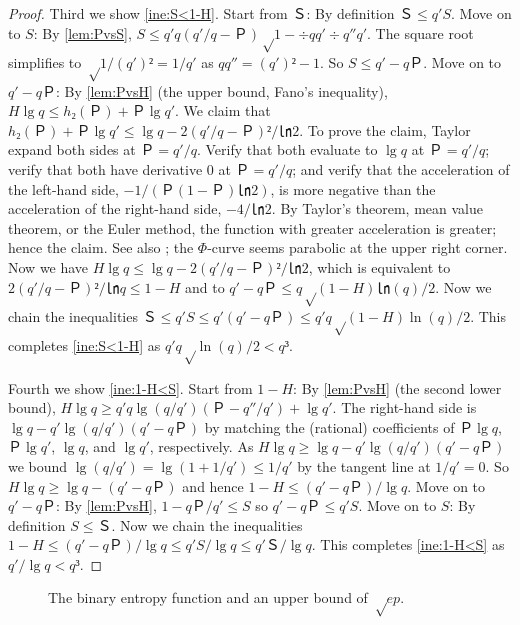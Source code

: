 \documentclass[openany]{amsbook}
\numberwithin{equation}{chapter}
\numberwithin{figure}{chapter}
\numberwithin{table}{chapter}
\theoremstyle{definition}	理dfn:Definition~?s			理exa:Example~?s
\theoremstyle{remark}		理cla:Claim~?s				理rem:Remark~?s
\begin{document}
\begin{proof}
		Third we show \cref{ine:S<1-H}.
		Start from $Ｓ$:
		By definition $Ｓ≤q'S$.
		Move on to $S$:
		By \cref{lem:PvsS}, $S≤q'q(q'/q-Ｐ)√{1-÷q{q'}÷{q''}{q'}}$.
		The square root simplifies to $√{1/(q')²}=1/q'$ as $qq''=(q')²-1$.
		So $S≤q'-qＰ$.
		Move on to $q'-qＰ$:
		By \cref{lem:PvsH} (the upper bound, Fano's inequality),
		$H\lg q≤h₂(Ｐ)+Ｐ\lg q'$.
		We claim that $h₂(Ｐ)+Ｐ\lg q'≤\lg q-2(q'/q-Ｐ)²/㏑2$.
		To prove the claim, Taylor expand both sides at $Ｐ=q'/q$.
		Verify that both evaluate to $\lg q$ at $Ｐ=q'/q$;
		verify that both have derivative $0$ at $Ｐ=q'/q$; and
		verify that the acceleration of the left-hand side, $-1/(Ｐ(1-Ｐ)㏑2)$,
		is more negative than the acceleration of the right-hand side, $-4/㏑2$.
		By Taylor's theorem, mean value theorem, or the Euler method,
		the function with greater acceleration is greater;
		hence the claim.
		See also \cite[Fig.~1]{FM94};
		the $Φ$-curve seems parabolic at the upper right corner.
		Now we have $H\lg q≤\lg q-2(q'/q-Ｐ)²/㏑2$, which is equivalent to
		$2(q'/q-Ｐ)²/㏑q≤1-H$ and to $q'-qＰ≤q√{(1-H)㏑(q)/2}$.
		Now we chain the inequalities $Ｓ≤q'S≤q'(q'-qＰ)≤q'q√{(1-H)\ln(q)/2}$.
		This completes \cref{ine:S<1-H} as $q'q√{\ln(q)/2}<q³$.
		
		Fourth we show \cref{ine:1-H<S}.
		Start from $1-H$:
		By \cref{lem:PvsH} (the second lower bound),
		$H\lg q≥q'q\lg(q/q')(Ｐ-q''/q')+\lg q'$.
		The right-hand side is $\lg q-q'\lg(q/q')(q'-qＰ)$
		by matching the (rational) coefficients of
		$Ｐ\lg q$, $Ｐ\lg q'$, $\lg q$, and $\lg q'$, respectively.
		As $H\lg q≥\lg q-q'\lg(q/q')(q'-qＰ)$ we bound
		$\lg(q/q')=\lg(1+1/q')≤1/q'$ by the tangent line at $1/q'=0$.
		So $H\lg q≥\lg q-(q'-qＰ)$ and hence $1-H≤(q'-qＰ)/\lg q$.
		Move on to $q'-qＰ$:
		By \cref{lem:PvsH}, $1-qＰ/q'≤S$ so $q'-qＰ≤q'S$.
		Move on to $S$:
		By definition $S≤Ｓ$.
		Now we chain the inequalities
		$1-H≤(q'-qＰ)/\lg q≤q'S/\lg q≤q'Ｓ/\lg q$.
		This completes \cref{ine:1-H<S} as $q'/\lg q<q³$.
	\end{proof}
	
	\begin{figure}
		\caption{
			The binary entropy function and an upper bound of $√{ep}$.
		}\label{fig:rootep}
	\end{figure}
	
\end{document}
